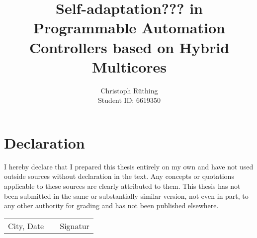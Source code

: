 \documentclass[
	a4paper,
	12pt,
	twoside,
	DIV=10,
	abstracton,
	parskip,
	listof=totoc,
	bibliography=totoc]{scrreprt}
\begin{document}



\subject{
	Master Thesis}
\title{
	Self-adaptation??? in Programmable Automation Controllers based on Hybrid
	Multicores}
\author{
	Christoph Rüthing\\[-12pt]
	Student ID: 6619350}
\publishers{
	{\large Supervisors}\\[12pt]
	Prof. Dr. Marco Platzner\\
	Dipl.-Inf. Andreas Agne}
\lowertitleback{
	Master Thesis\\
	\textbf{
		Self-adaptation in Programmable Automation Controller\\
		based on Hybrid Multicores}\\[.5cm]
	University of Paderborn\\
	Faculty of Electrical Engineering, Computer Science and Mathematics\\
	Department of Computer Science\\
	Warburger Str. 100\\
	33098 Paderborn}

\maketitle



\chapter*{Declaration}

I hereby declare that I prepared this thesis entirely on my own and have not
used outside sources without declaration in the text. Any concepts or
quotations applicable to these sources are clearly attributed to them. This
thesis has not been submitted in the same or substantially similar version,
not even in part, to any other authority for grading and has not been
published elsewhere.\\[27pt]

\begin{center}
	\begin{tabular}{l p{} r}
		\cline{1-1}\cline{3-3}
		\begin{minipage}[t]{0.4\textwidth}
			\centering
			City, Date
		\end{minipage}
		&
		\begin{minipage}[t]{0.2\textwidth}
		\end{minipage}
		&
		\begin{minipage}[t]{0.4\textwidth}
  			\centering
  			Signatur
		\end{minipage}
	\end{tabular}
\end{center}
\end{document}

